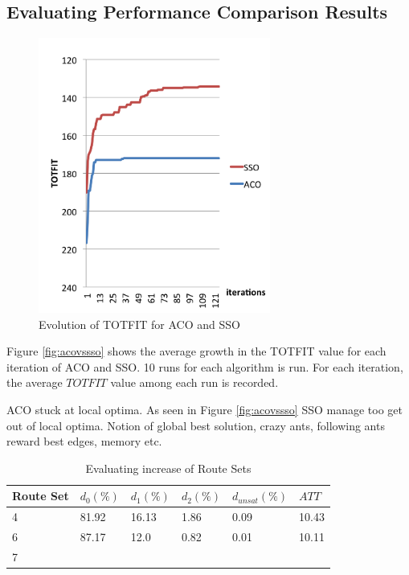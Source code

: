 \subsection{Evaluating Performance Comparison Results}

 \begin{figure}[H]
    \begin{center}
    \includegraphics[width=3in]{assets/acovsssoNEW.png}
    \end{center}
    \caption{Evolution of TOTFIT for ACO and SSO }
    \label{fig:acovssso} 
    \end{figure}

Figure \vref{fig:acovssso} shows the average growth in the TOTFIT value for each iteration of ACO and SSO. 10 runs for each algorithm is run. For each iteration, the average $TOTFIT$ value among each run is recorded. 

ACO stuck at local optima. As seen in Figure \vref{fig:acovssso} SSO manage too get out of local optima. Notion of global best solution, crazy ants, following ants reward best edges, memory etc.

 \begin{table}[H]
    \centering
    \begin{tabular}{|l||l|l|l|l|l|}
    \hline
    Route Set & $d_0(\%)$ & $d_1(\%)$ & $d_2(\%)$ & $d_{unsat}(\%)$ & $ATT$ \\
    \hline
    4 & 81.92 & 16.13 & 1.86 & 0.09 & 10.43\\
    \hline
    6 & 87.17 & 12.0 & 0.82 & 0.01 & 10.11\\
    \hline
    7 \\
    \hline
    \end{tabular}
    \caption {Evaluating increase of Route Sets}
    \label{table:performanceComparison_ACOSSOBEST}
    \end{table}

